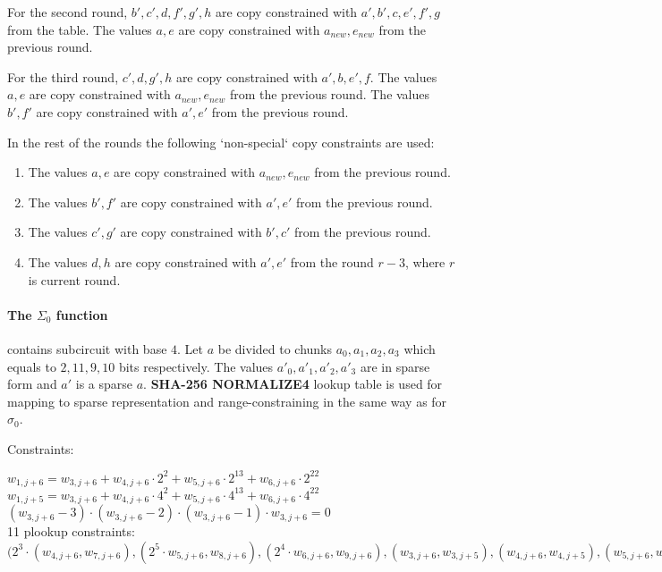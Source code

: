 For the second round, $b', c' , d, f', g', h$ are copy constrained with $a', b', c, e', f', g$ from the table.
The values $a, e$ are copy constrained with $a_{new}, e_{new}$ from the previous round.

For the third round, $c' , d, g', h$ are copy constrained with $a', b, e', f$.
The values $a, e$ are copy constrained with $a_{new}, e_{new}$ from the previous round.
The values $b', f'$ are copy constrained with $a', e'$ from the previous round.

In the rest of the rounds the following `non-special` copy constraints are used:
\begin{enumerate}
\item The values $a, e$ are copy constrained with $a_{new}, e_{new}$ from the previous round.
\item The values $b', f'$ are copy constrained with $a', e'$ from the previous round.
\item The values $c', g'$ are copy constrained with $b', c'$ from the previous round.
\item The values $d, h$ are copy constrained with $a', e'$ from the round $r - 3$, where $r$ is current round.
\end{enumerate}

\paragraph{The $\Sigma_0$ function}
contains subcircuit with base $4$.
Let $a$ be divided to chunks $a_0, a_1, a_2, a_3$ which equals to $2, 11, 9, 10$ bits respectively.
The values $a'_0, a'_1, a'_2, a'_3$ are in sparse form and $a'$ is a sparse $a$.
\textbf{SHA-256 NORMALIZE4} lookup table is used for mapping to sparse representation and range-constraining in the same way as for $\sigma_0$.

Constraints:
\begin{center}
    $w_{1, j + 6}= w_{3, j + 6} + w_{4, j + 6} \cdot 2^{2} + w_{5, j + 6} \cdot 2^{13} + w_{6, j + 6} \cdot 2^{22}$ \\
    $w_{1, j + 5} = w_{3, j + 6} + w_{4, j + 6} \cdot 4^{2} + w_{5, j + 6} \cdot 4^{13} + w_{6, j + 6} \cdot 4^{22}$ \\
    $(w_{3,j + 6} - 3) \cdot (w_{3,j + 6} - 2) \cdot (w_{3,j + 6} - 1) \cdot w_{3,j + 6} = 0$ \\
    11 plookup constraints: $(2^3 \cdot (w_{4, j + 6}, w_{7, j + 6}), (2^5 \cdot w_{5, j + 6}, w_{8, j + 6}), (2^4 \cdot w_{6, j+6}, w_{9, j + 6}), (w_{3,j + 6}, w_{3,j+5}), (w_{4, j + 6}, w_{4, j + 5}), (w_{5, j + 6}, w_{5, j + 5}), (w_{6, j + 6}, w_{6, j + 5}), (w_{6, j + 4}, (w_{4, j + 5} + w_{5,j + 5} + w_{6,j + 5}), (w_{7, j + 4}, (w_{5,j + 5} + w_{6,j + 5} + w_{3,j + 5}, (w_{8, j + 4}, (w_{6,j + 5} + w_{3,j + 5} + w_{4,j + 5}), (w_{9, j + 4}, (w_{3,j + 5} + w_{4,j + 5} + w_{5,j + 5})$ \\
\end{center}

